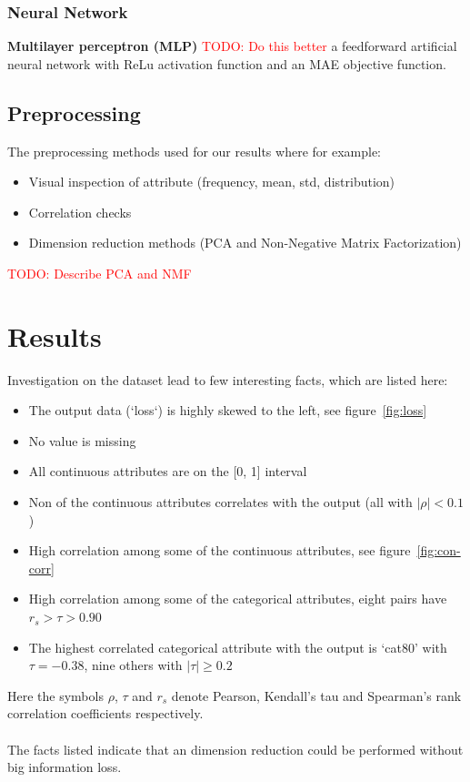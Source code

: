 \documentclass[a4paper]{article}
\newcommand\todo[1]{\textcolor{red}{TODO: #1}}
\begin{document}
\subsubsection{Neural Network}
\textbf{Multilayer perceptron (MLP)} \todo{Do this better} a feedforward artificial neural network with ReLu activation function and an MAE objective function.

\subsection{Preprocessing}
The preprocessing methods used for our results where for example:
\begin{itemize}
    \item Visual inspection of attribute (frequency, mean, std, distribution)
    \item Correlation checks
    \item Dimension reduction methods (PCA and Non-Negative Matrix Factorization)
\end{itemize}

\todo{Describe PCA and NMF}


%

\section{Results}
Investigation on the dataset lead to few interesting facts, which are listed here:
\begin{itemize}
    \item The output data (‘loss‘) is highly skewed to the left, see figure~\ref{fig:loss}
    \item No value is missing
    \item All continuous attributes are on the [0, 1] interval
    \item Non of the continuous attributes correlates with the output (all with $|\rho| < 0.1$)
    \item High correlation among some of the continuous attributes, see figure~\ref{fig:con-corr}
    \item High correlation among some of the categorical attributes, eight pairs have $r_s > \tau > 0.90$
    \item The highest correlated categorical attribute with the output is ‘cat80’ with $\tau=-0.38$, nine others with $|\tau| \geq 0.2$
\end{itemize}
Here the symbols $\rho$, $\tau$ and $r_s$ denote Pearson, Kendall's tau and Spearman’s rank correlation coefficients respectively. \\\\
The facts listed indicate that an dimension reduction could be performed without big information loss.
\end{document}
